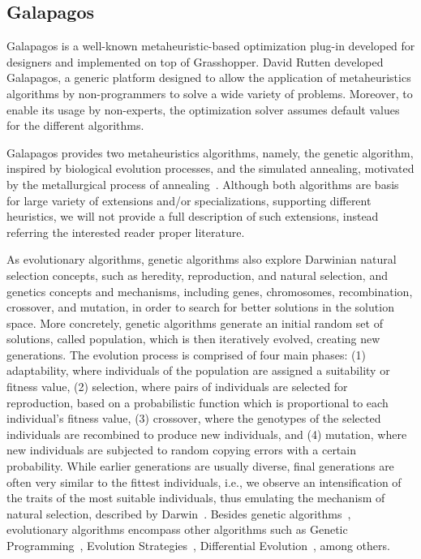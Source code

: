 	
\subsection{Galapagos}
\label{subsec:galapagos}
	Galapagos is a well-known metaheuristic-based optimization plug-in developed for designers and implemented on top of Grasshopper. David Rutten developed Galapagos, a generic platform designed to allow the application of metaheuristics algorithms by non-programmers to solve a wide variety of problems. Moreover, to enable its usage by non-experts, the optimization solver assumes default values for the different algorithms. 

	Galapagos provides two metaheuristics algorithms, namely, the genetic algorithm, inspired by biological evolution processes, and the simulated annealing, motivated by the metallurgical process of annealing~\cite{Brownlee2011}. Although both algorithms are basis for large variety of extensions and/or specializations, supporting different heuristics, we will not provide a full description of such extensions, instead referring the interested reader proper literature. 

	As evolutionary algorithms, genetic algorithms also explore Darwinian natural selection concepts, such as heredity, reproduction, and natural selection, and genetics concepts and mechanisms, including genes, chromosomes, recombination, crossover, and mutation, in order to search for better solutions in the solution space. More concretely, genetic algorithms generate an initial random set of solutions, called population, which is then iteratively evolved, creating new generations. The evolution process is comprised of four main phases: (1) adaptability, where individuals of the population are assigned a suitability or fitness value, (2) selection, where pairs of individuals are selected for reproduction, based on a probabilistic function which is proportional to each individual's fitness value, (3) crossover, where the genotypes of the selected individuals are recombined to produce new individuals, and (4) mutation, where new individuals are subjected to random copying errors with a certain probability. While earlier generations are usually diverse, final generations are often very similar to the fittest individuals, i.e., we observe an intensification of the traits of the most suitable individuals, thus emulating the mechanism of natural selection, described by Darwin~\cite{Brownlee2011}. Besides genetic algorithms~\cite{Golberg1989,Holland1992}, evolutionary algorithms encompass other algorithms such as Genetic Programming~\cite{Koza1992}, Evolution Strategies~\cite{Schwefel1981}, Differential Evolution~\cite{Storn1997}, among others. 
	
